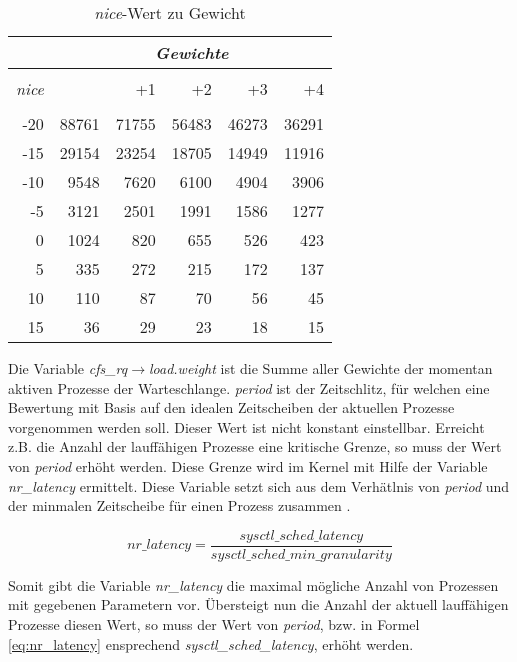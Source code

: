 \begin {table}[h]
\begin{center}
\begin{tabular}{r|rrrrr}
 &	\multicolumn{5}{c}{\textit{Gewichte}} \\
	\hline\hline
	\\[\dimexpr-\normalbaselineskip+2pt]
	\textit{nice} & &+1	&	+2	& +3	& +4	\\
	\hline
    \\[\dimexpr-\normalbaselineskip+2pt]
	-20	&	88761	&	71755	&	56483	&	46273	&	36291	\\
	-15	&	29154 	&	23254 	&	18705 	&	14949 	&	11916	\\
	-10	&	9548	&	7620	&	6100	&	4904	&	3906	\\
	-5 	&	3121 	&	2501 	&	1991 	&	1586 	&	1277	\\
	0	&	1024 	&	820		&	655		&	526		&	423		\\
	5 	&	335 	&	272		& 	215		&	172		&	137		\\
	10	&	110		&	87 		&	70 		&	56 		&	45		\\
	15 	&	36 		&	29 		&	23 		&	18 		&	15	 	\\		
\end{tabular}
\caption {\textit{nice}-Wert zu Gewicht} \label{tab:nice2weight} 
\end{center}
\end{table}

   
Die Variable \textit{cfs\_rq$\rightarrow$load.weight} ist die Summe aller Gewichte der momentan aktiven Prozesse der Warte\-schlan\-ge.
\textit{period} ist der Zeitschlitz, für welchen eine Bewertung mit Basis auf den idealen Zeitscheiben der aktuellen Prozesse vorgenommen werden soll. Dieser Wert ist nicht konstant einstellbar. Erreicht z.B. die Anzahl der lauf\-fähigen Prozesse eine kritische Grenze, so muss der Wert von \textit{period} erhöht werden. 
Diese Grenze wird im Kernel mit Hilfe der Variable \textit{nr\_latency} ermittelt. Diese Variable setzt sich aus dem Verhätlnis von \textit{period} und der minmalen Zeitscheibe für einen Prozess zusammen \cite{paperfairness}.

\begin{equation}
nr\_latency = \frac{sysctl\_sched\_latency}{sysctl\_sched\_min\_granularity}
\label{eq:nr_latency}
\end{equation}

Somit gibt die Variable \textit{nr\_latency} die maximal mögliche Anzahl von Prozessen mit gegebenen Parametern vor. Über\-steigt nun die Anzahl der aktuell lauffähigen Prozesse diesen Wert, so muss der Wert von \textit{period}, bzw. in Formel \ref{eq:nr_latency} ensprechend \textit{sysctl\_sched\_latency}, erhöht werden.

